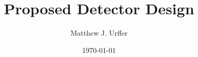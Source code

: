 \documentclass[]{report}
\title{Proposed Detector Design}
\author{Matthew J. Urffer}
\date{\today}
\begin{document}
\maketitle

\listoftodos






\end{document}
